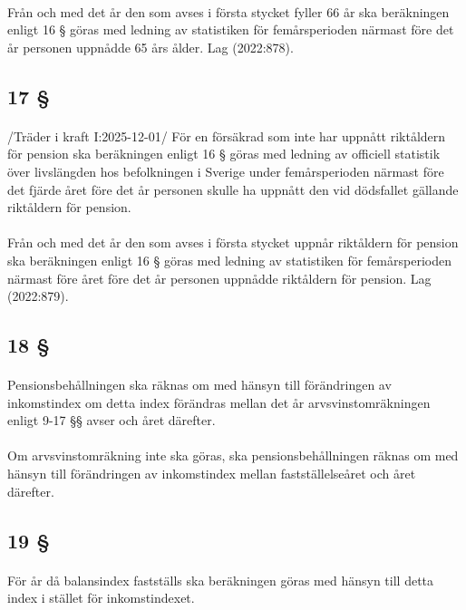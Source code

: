 \documentclass[a4paper,notitlepage,openany,10pt]{book}
\begin{document}
\paragraph*{}
Från och med det år den som avses i första stycket fyller 66 år ska beräkningen enligt 16 § göras med ledning av statistiken för femårsperioden närmast före det år personen uppnådde 65 års ålder.
Lag (2022:878).
\subsection*{17 §}
\paragraph*{}
/Träder i kraft I:2025-12-01/
För en försäkrad som inte har uppnått riktåldern för pension ska beräkningen enligt 16 § göras med ledning av officiell statistik över livslängden hos befolkningen i Sverige under femårsperioden närmast före det fjärde året före det år personen skulle ha uppnått den vid dödsfallet gällande riktåldern för pension.
\paragraph*{}
Från och med det år den som avses i första stycket uppnår riktåldern för pension ska beräkningen enligt 16 § göras med ledning av statistiken för femårsperioden närmast före året före det år personen uppnådde riktåldern för pension.
Lag (2022:879).
\subsection*{18 §}
\paragraph*{}
Pensionsbehållningen ska räknas om med hänsyn till förändringen av inkomstindex om detta index förändras mellan det år arvsvinstomräkningen enligt 9-17 §§ avser och året därefter.
\paragraph*{}
Om arvsvinstomräkning inte ska göras, ska pensionsbehållningen räknas om med hänsyn till förändringen av inkomstindex mellan fastställelseåret och året därefter.
\subsection*{19 §}
\paragraph*{}
För år då balansindex fastställs ska beräkningen göras med hänsyn till detta index i stället för inkomstindexet.
\end{document}
